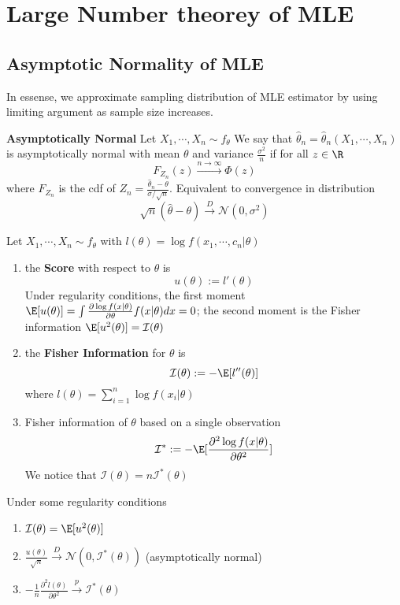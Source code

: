 \documentclass[11pt]{article}
\begin{document}
\section*{Large Number theorey of MLE}

\subsection*{Asymptotic Normality of MLE}

In essense, we approximate sampling distribution of MLE estimator by using limiting argument as sample size increases.

\begin{defn*}
  \textbf{Asymptotically Normal} Let $X_1,\cdots, X_n \sim f_{\theta}$ We say that $\hat{\theta}_n = \hat{\theta}_n(X_1, \cdots, X_n)$ is asymptotically normal with mean $\theta$ and variance $\frac{\sigma^2}{n}$ if for all $z\in \R$
  \[
    F_{Z_n}(z) \stackrel{n\to \infty}{\to} \Phi(z)
  \]
  where $F_{Z_n}$ is the cdf of $Z_n = \frac{\hat{\theta}_n - \theta}{\sigma / \sqrt{n}}$. Equivalent to convergence in distribution
  \[
    \sqrt{n}(\hat{\theta} - \theta) \stackrel{D}{\to} \mathcal{N}(0,\sigma^2)
  \]
\end{defn*}

\begin{defn*}
  Let $X_1, \cdots, X_n\sim f_{\theta}$ with $l(\theta) = \log f(x_1, \cdots, c_n | \theta)$
  \begin{enumerate}
    \item the \textbf{Score} with respect to $\theta$ is
    \[
      u(\theta) := l'(\theta)
    \]
    Under regularity conditions, the first moment $\E[u(\theta)]= \int \frac{\partial \log f(x|\theta)}{\partial \theta} f(x|\theta) dx =0$; the second moment is the Fisher information $\E[u^2(\theta)] = \mathcal{I}(\theta)$
    \item the \textbf{Fisher Information} for $\theta$ is
    \[
      \mathcal{I}(\theta) := - \E [l{''}(\theta)]
    \]
    where $l(\theta) = \sum_{i=1}^n \log f(x_i | \theta)$
    \item Fisher information of $\theta$ based on a single observation
    \[
      \mathcal{I}^* := - \E [\frac{\partial^2 \log f(x|\theta)}{\partial \theta^2} ]
    \]
    We notice that $\mathcal{I}(\theta) = n \mathcal{I}^* (\theta)$
  \end{enumerate}
\end{defn*}

\begin{proposition*}
    Under some regularity conditions
    \begin{enumerate}
        \item $\mathcal{I}(\theta) = \E [u^2(\theta)]$
        \item $\frac{u(\theta)}{\sqrt{n}} \stackrel{D}{\to} \mathcal{N}(0, \mathcal{I}^*(\theta))$ (asymptotically normal)
        \item $-\frac{1}{n} \frac{\partial^2 l(\theta)}{\partial \theta^2} \stackrel{p}{\to} \mathcal{I}^* (\theta)$
    \end{enumerate}
\end{proposition*}
\end{document}
